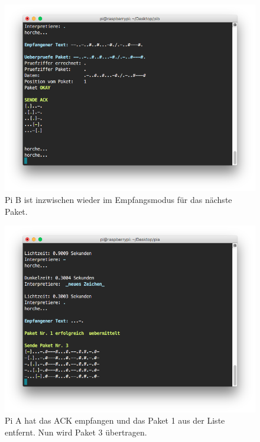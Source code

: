 \documentclass[12pt, a4paper]{article}
\begin{document}
\newpage
\begin{figure}[H]
	\centering
	\includegraphics[width=1.0\textwidth]{sshot_24.png}
	\caption{Pi B ist inzwischen wieder im Empfangsmodus für das nächste Paket.}
\end{figure}

\newpage
\begin{figure}[H]
	\centering
	\includegraphics[width=1.0\textwidth]{sshot_25.png}
	\caption{Pi A hat das ACK empfangen und das Paket 1 aus der Liste entfernt. Nun wird Paket 3 übertragen.}
\end{figure}
\end{document}
